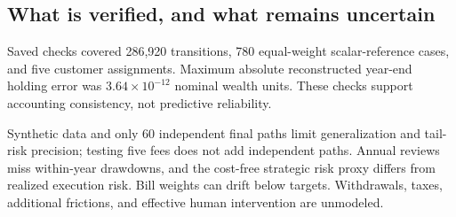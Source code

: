 \subsection{What is verified, and what remains uncertain}
Saved checks covered 286,920 transitions, 780 equal-weight scalar-reference cases, and five customer assignments. Maximum absolute reconstructed year-end holding error was $3.64\times10^{-12}$ nominal wealth units. These checks support accounting consistency, not predictive reliability.

Synthetic data and only 60 independent final paths limit generalization and tail-risk precision; testing five fees does not add independent paths. Annual reviews miss within-year drawdowns, and the cost-free strategic risk proxy differs from realized execution risk. Bill weights can drift below targets. Withdrawals, taxes, additional frictions, and effective human intervention are unmodeled.
